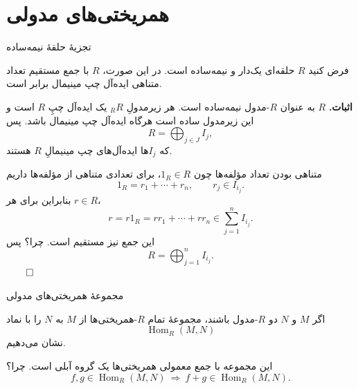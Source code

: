 \section{همریختی‌های مدولی}

\begin{frame}[t]{تجزیهٔ حلقهٔ نیمه‌ساده}
    \label{lec07:semisimple-ring}
    \begin{theorem}
        فرض کنید \(R\) حلقه‌ای یک‌دار و نیمه‌ساده است. در این صورت، \(R\) با جمع مستقیم تعداد متناهی ایده‌آل چپ مینیمال برابر است.
    \end{theorem}
    \textbf{اثبات.}
    \(R\) به عنوان \(R\)-مدول نیمه‌ساده است. هر زیرمدولِ \({}_R R\) یک ایده‌آل چپِ \(R\) است و این زیرمدول ساده است هرگاه ایده‌آل چپ مینیمال باشد. پس
    \[
        R=\bigoplus_{j\in J}I_j,
    \]
    که \(I_j\)ها ایده‌آل‌های چپ مینیمالِ \(R\) هستند.
\end{frame}

\begin{frame}[t]{متناهی بودن تعداد مؤلفه‌ها}
    \label{lec07:finite-components}
    چون \(1_R\in R\)، برای تعدادی متناهی از مؤلفه‌ها داریم
    \[
        1_R=r_1+\cdots+r_n,\qquad r_j\in I_{i_j}.
    \]
    بنابراین برای هر \(r\in R\)،
    \[
        r=r1_R=rr_1+\cdots+rr_n\in\sum_{j=1}^{n}I_{i_j}.
    \]
    این جمع نیز مستقیم است. \alert{چرا؟} پس
    \[
        R=\bigoplus_{j=1}^{n}I_{i_j}.
    \]
    \hfill\(\qed\)
\end{frame}

\begin{frame}[t]{مجموعهٔ همریختی‌های مدولی}
    \label{lec07:hom-definition}
    \begin{definition}
        اگر \(M\) و \(N\) دو \(R\)-مدول باشند، مجموعهٔ تمام \(R\)-همریختی‌ها از \(M\) به \(N\) را با نماد
        \[
            \operatorname{Hom}_R(M,N)
        \]
        نشان می‌دهیم.
    \end{definition}
    \begin{remark}
        این مجموعه با جمع معمولی همریختی‌ها یک گروه آبلی است. \alert{چرا؟}
        \[
            f,g\in\operatorname{Hom}_R(M,N)
            \ \Longrightarrow\ f+g\in\operatorname{Hom}_R(M,N).
        \]
    \end{remark}
\end{frame}

